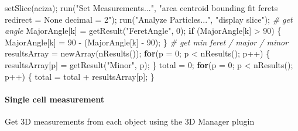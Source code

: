 \documentclass[10pt, b5paper, singlespacinge, twoside]{reedthesis} %
\newenvironment{Shaded}{}{}
\newcommand{\AttributeTok}[1]{#1}
\newcommand{\CommentTok}[1]{\textit{#1}}
\newcommand{\ControlFlowTok}[1]{\textbf{#1}}
\newcommand{\DecValTok}[1]{#1}
\newcommand{\FunctionTok}[1]{#1}
\newcommand{\NormalTok}[1]{#1}
\newcommand{\OtherTok}[1]{#1}
\newcommand{\SpecialCharTok}[1]{#1}
\newcommand{\StringTok}[1]{#1}
\theoremstyle{definition}
\theoremstyle{definition}
\theoremstyle{definition}
\theoremstyle{remark}
\begin{document}
\begin{Shaded}
\begin{Highlighting}[numbers=left,,]
        \FunctionTok{setSlice}\NormalTok{(aciza);}
        \FunctionTok{run}\NormalTok{(}\StringTok{"Set Measurements..."}\NormalTok{, }\StringTok{"area centroid bounding fit feret\textquotesingle{}s redirect = None decimal = 2"}\NormalTok{);}
        \FunctionTok{run}\NormalTok{(}\StringTok{"Analyze Particles..."}\NormalTok{, }\StringTok{"display slice"}\NormalTok{);}
    \CommentTok{\# get angle}
\NormalTok{        MajorAngle[k] }\OtherTok{=} \FunctionTok{getResult}\NormalTok{(}\StringTok{"FeretAngle"}\NormalTok{, }\DecValTok{0}\NormalTok{);}
        \ControlFlowTok{if}\NormalTok{ (MajorAngle[k] }\SpecialCharTok{\textgreater{}} \DecValTok{90}\NormalTok{) \{}
\NormalTok{          MajorAngle[k] }\OtherTok{=} \DecValTok{90} \SpecialCharTok{{-}}\NormalTok{ (MajorAngle[k] }\SpecialCharTok{{-}} \DecValTok{90}\NormalTok{);}
\NormalTok{        \}}
    \CommentTok{\# get min feret / major / minor}
\NormalTok{        resultsArray }\OtherTok{=} \FunctionTok{newArray}\NormalTok{(}\FunctionTok{nResults}\NormalTok{());}
            \ControlFlowTok{for}\NormalTok{(}\AttributeTok{p =} \DecValTok{0}\NormalTok{; p }\SpecialCharTok{\textless{}} \FunctionTok{nResults}\NormalTok{(); p}\SpecialCharTok{++}\NormalTok{) \{ }
\NormalTok{            resultsArray[p] }\OtherTok{=} \FunctionTok{getResult}\NormalTok{(}\StringTok{"Minor"}\NormalTok{, p); }
\NormalTok{            \}}
\NormalTok{            total }\OtherTok{=} \DecValTok{0}\NormalTok{; }
            \ControlFlowTok{for}\NormalTok{(}\AttributeTok{p =} \DecValTok{0}\NormalTok{; p }\SpecialCharTok{\textless{}} \FunctionTok{nResults}\NormalTok{(); p}\SpecialCharTok{++}\NormalTok{) \{ }
\NormalTok{                total }\OtherTok{=}\NormalTok{ total }\SpecialCharTok{+}\NormalTok{ resultsArray[p]; }
\NormalTok{            \}}
\end{Highlighting}
\end{Shaded}
\normalsize

\hypertarget{single-cell-measurement}{%
\paragraph{Single cell measurement}\label{single-cell-measurement}}

Get 3D measurements from each object using the 3D Manager plugin
\end{document}
